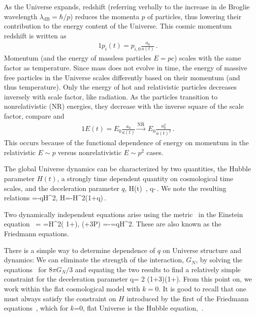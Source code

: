 As the Universe expands, redshift (referring verbally to the increase in de Broglie wavelength $\lambda_\mathrm{dB}=\hbar /p$) reduces the momenta $p$ of particles, thus lowering their contribution to the energy content of the Universe. This cosmic momentum redshift is written as
\begin{alignat}{1}
 \label{Redshift} p_{i}(t) = p_{i,0}\frac{a_{0}}{a(t)}\,.
\end{alignat}
Momentum (and the energy of massless particles $E=pc$) scales with the same factor as temperature. Since mass does not evolve in time, the energy of massive free particles in the Universe scales differently based on their momentum (and thus temperature). Only the energy of hot and relativistic particles decreases inversely with scale factor, like radiation. As the particles transition to nonrelativistic (NR) energies, they decrease with the inverse square of the scale factor, compare  and 
\begin{alignat}{1}
 \label{EScale} E(t) = E_{0}\frac{a_{0}}{a(t)}\xrightarrow{\mathrm{NR}}\ E_{0}\frac{a_{0}^{2}}{a(t)^{2}}\,.
\end{alignat}
This occurs because of the functional dependence of energy on momentum in the relativistic $E\sim p$ versus nonrelativistic $E\sim p^{2}$ cases.


The global Universe dynamics can be characterized by two quantities, the Hubble parameter $H(t)$, a strongly time dependent quantity on cosmological time scales, and the deceleration parameter $q$,
\beqn\label{dynamic}
H(t)\equiv{} \,, 
\eeqn
\beqn\label{dynamic1}
q\equiv -\,.
\eeqn
We note the resulting relations
\beqn\label{eq:Hdot1}
 =-qH^2,
 \eeqn
\beqn\label{eq:Hdot}
 \dot H=-H^2(1+q)\,. 
\eeqn
{}

Two dynamically independent equations arise using the metric~ in the Einstein equation~
\beqn\label{hubble}
 \rho = 
=H^2\left( 1+\right),
\qquad
{} (\rho+3P) =-=qH^2.
\eeqn
These are also known as the Friedmann equations. 

There is a simple way to determine dependence of $q$ on Universe structure and dynamics: We can eliminate the strength of the interaction, $G_N$, by solving the equations~ for ${8\pi G_N}/{3}$ and equating the two results to find a relatively simple constraint for the deceleration parameter
\beqn\label{qparam0}
q= 2 \left(1+3\right)\left(1+\right).
\eeqn
From this point on, we work within the flat cosmological model with $k=0$. It is good to recall that one must always satisfy the constraint on $H$ introduced by the first of the Friedmann equations~, which for $k$=0, flat Universe is the Hubble equation,~.

